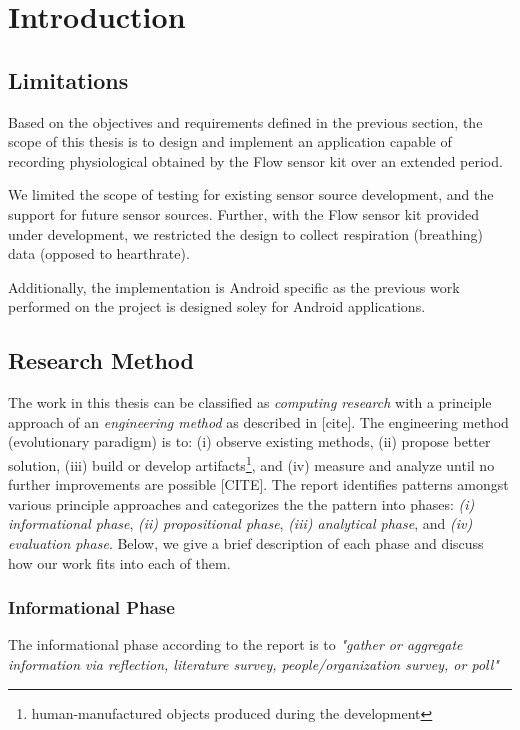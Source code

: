 \chapter{Introduction}\label{introduction}




\section{Limitations}
Based on the objectives and requirements defined in the previous section, the scope of this thesis is to design and implement an application capable of recording physiological obtained by the Flow sensor kit over an extended period. 

We limited the scope of testing for existing sensor source development, and the support for future sensor sources. Further, with the Flow sensor kit provided under development, we restricted the design to collect respiration (breathing) data (opposed to hearthrate).

Additionally, the implementation is Android specific as the previous work performed on the project is designed soley for Android applications. 

\section{Research Method}
The work in this thesis can be classified as \textit{computing research} with a principle approach of an \textit{engineering method} as described in [cite]. The engineering method (evolutionary paradigm) is to: (i) observe existing methods, (ii) propose better solution, (iii)  build or develop artifacts\footnote{human-manufactured objects produced during the development}, and (iv) measure and analyze until no further improvements are possible [CITE]. The report identifies patterns amongst various principle approaches and categorizes the the pattern into phases: \textit{(i) informational phase}, \textit{(ii) propositional phase}, \textit{(iii) analytical phase}, and \textit{(iv) evaluation phase}. Below, we give a brief description of each phase and discuss how our work fits into each of them. 

\subsection{Informational Phase}
The informational phase according to the report is to \textit{"gather or aggregate information via reflection, literature survey, people/organization survey, or poll"}

